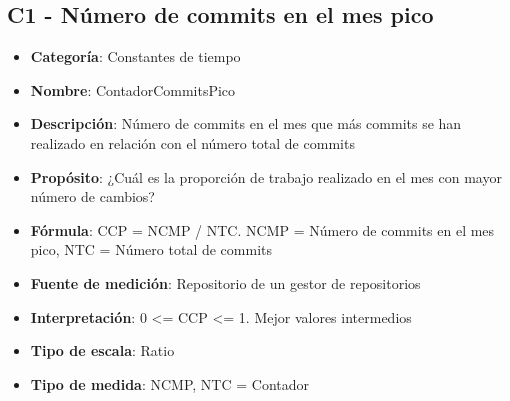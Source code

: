 \subsection{C1 - Número de commits en el mes pico}
\begin{itemize}
	\item \textbf{Categoría}: Constantes de tiempo
	\item \textbf{Nombre}: ContadorCommitsPico
	\item \textbf{Descripción}: Número de commits en el mes que más commits se han realizado en relación con el número total de commits
	\item \textbf{Propósito}: ¿Cuál es la proporción de trabajo realizado en el mes con mayor número de cambios?
	\item \textbf{Fórmula}: CCP = NCMP / NTC. NCMP = Número de commits en el mes pico, NTC = Número total de commits
	\item \textbf{Fuente de medición}: Repositorio de un gestor de repositorios
	\item \textbf{Interpretación}: 0 <= CCP <= 1. Mejor valores intermedios
	\item \textbf{Tipo de escala}: Ratio
	\item \textbf{Tipo de medida}: NCMP, NTC = Contador
\end{itemize}